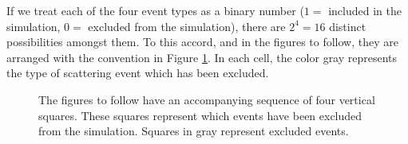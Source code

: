If we treat each of the four event types as a binary number ($1=$ included
in the simulation, $0=$ excluded from the simulation), there are $2^4=16$
distinct possibilities amongst them.  To this accord, and in the figures to
follow, they are arranged with the convention in Figure
\ref{fig:cleverbinary}.  In each cell, the color gray represents the type of
scattering event which has been excluded.
\begin{figure}
\centering
{}
\caption{The figures to follow have an accompanying sequence of four
vertical squares.  These squares represent which events have been excluded 
from the simulation.  Squares in {\gray gray} represent excluded events.}
\label{fig:cleverbinary}
\end{figure}
